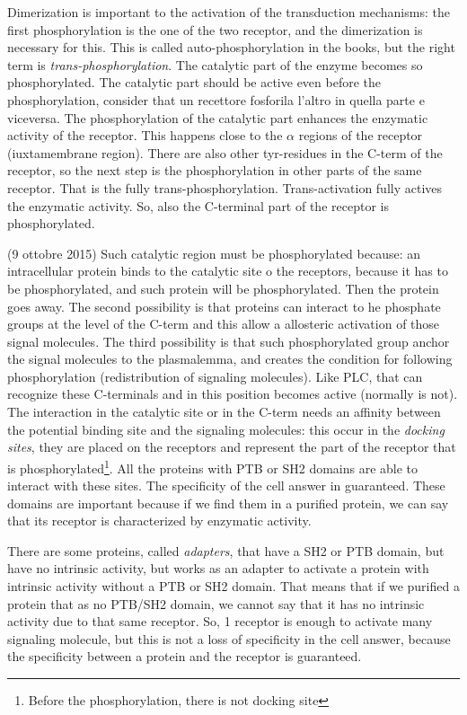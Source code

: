 \documentclass[a4paper, 12pt]{book}
\begin{document}
Dimerization is important to the activation of the transduction mechanisms: the first phosphorylation is the one of the two receptor, and the dimerization is necessary for this. This is called auto-phosphorylation in the books, but the right term is \emph{trans-phosphorylation}. The catalytic part of the enzyme becomes so phosphorylated. The catalytic part should be active even before the phosphorylation, consider that un recettore fosforila l'altro in quella parte e viceversa. The phosphorylation of the catalytic part enhances the enzymatic activity of the receptor. This happens close to the $\alpha$ regions of the receptor (iuxtamembrane region). There are also other tyr-residues in the C-term of the receptor, so the next step is the phosphorylation in other parts of the same receptor. That is the fully trans-phosphorylation. Trans-activation fully actives the enzymatic activity. So, also the C-terminal part of the receptor is phosphorylated.

(9 ottobre 2015)
Such catalytic region must be phosphorylated because: an intracellular protein binds to the catalytic site o the receptors, because it has to be phosphorylated, and such protein will be phosphorylated. Then the protein goes away. The second possibility is that proteins can interact to he phosphate groups at the level of the C-term and this allow a allosteric activation of those signal molecules. The third possibility is that such phosphorylated group anchor the signal molecules to the plasmalemma, and creates the condition for following phosphorylation (redistribution of signaling molecules). Like PLC, that can recognize these C-terminals and in this position becomes active (normally is not).
The interaction in the catalytic site or in the C-term needs an affinity between the potential binding site and the signaling molecules: this occur in the \emph{docking sites}, they are placed on the receptors and represent the part of the receptor that is phosphorylated\footnote{Before the phosphorylation, there is not docking site}. All the proteins with PTB or SH2 domains are able to interact with these sites. The specificity of the cell answer in guaranteed. These domains are important because if we find them in a purified protein, we can say that its receptor is characterized by enzymatic activity.

There are some proteins, called \emph{adapters}, that have a SH2 or PTB domain, but have no intrinsic activity, but works as an adapter to activate a protein with intrinsic activity without a PTB or SH2 domain. That means that if we purified a protein that as no PTB/SH2 domain, we cannot say that it has no intrinsic activity due to that same receptor. So, 1 receptor is enough to activate many signaling molecule, but this is not a loss of specificity in the cell answer, because the specificity between a protein and the receptor is guaranteed. 
\end{document}
